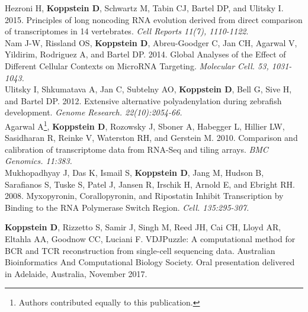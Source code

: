 \documentclass[10pt,a4paper]{article}
\begin{document}
{{{{{\noindent Hezroni H, \textbf{Koppstein D}, Schwartz M, Tabin CJ, Bartel DP, and Ulitsky I. 2015. Principles of long noncoding
RNA evolution derived from direct comparison of transcriptomes in 14 vertebrates. \textit{Cell Reports 11(7), 1110-1122}}. \vspace{0.5em} \\
{\noindent Nam J-W, Rissland OS, \textbf{Koppstein D}, Abreu-Goodger C, Jan CH, Agarwal V, Yildirim, Rodriguez A, and Bartel DP. 2014. Global Analyses of the Effect of Different Cellular Contexts on MicroRNA Targeting. \textit{Molecular Cell. 53, 1031-1043.}} \vspace{0.5em} \\
{\noindent Ulitsky I, Shkumatava A, Jan C, Subtelny AO, \textbf{Koppstein D}, Bell G, Sive H, and Bartel DP. 2012. Extensive alternative polyadenylation during zebrafish development. \textit{Genome Research. 22(10):2054-66.}} \vspace{0.5em} \\
{\noindent Agarwal A\footnote[1]{Authors contributed equally to this publication.}, \textbf{Koppstein D}\footnotemark[1], Rozowsky J, Sboner A, Habegger L, Hillier LW, Sasidharan R, Reinke V, Waterston RH, and Gerstein M. 2010. Comparison and calibration of transcriptome data from RNA-Seq and tiling arrays. \textit{BMC Genomics. 11:383.}} \vspace{0.3em} \\
{\noindent Mukhopadhyay J, Das K, Ismail S, \textbf{Koppstein D}, Jang M, Hudson B, Sarafianos S, Tuske S, Patel J, Jansen R, Irschik H, Arnold E, and Ebright RH. 2008. Myxopyronin, Corallopyronin, and Ripostatin Inhibit Transcription by Binding to the RNA Polymerase Switch Region. \textit{Cell. 135:295-307.}} \vspace{0.3em} \\

\spacedhrule{0.1em}{-0.4em}  %


{\noindent \textbf{Koppstein D}, Rizzetto S, Samir J, Singh M, Reed JH, Cai CH, Lloyd AR, Eltahla AA, Goodnow CC, Luciani F. VDJPuzzle: A computational method for BCR and TCR reconstruction from single-cell sequencing data. Australian Bioinformatics And Computational Biology Society. Oral presentation delivered in Adelaide, Australia, November 2017.} \vspace{-0.8em} \\

}}}}
\end{document}
